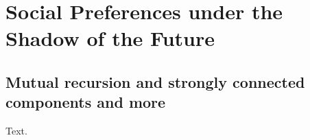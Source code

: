 \documentclass[12pt]{akizumi-book}
\begin{document}
\chapter{Social Preferences under the Shadow of the Future}
\section{Mutual recursion and strongly connected components and more}
Text.
\end{document}
